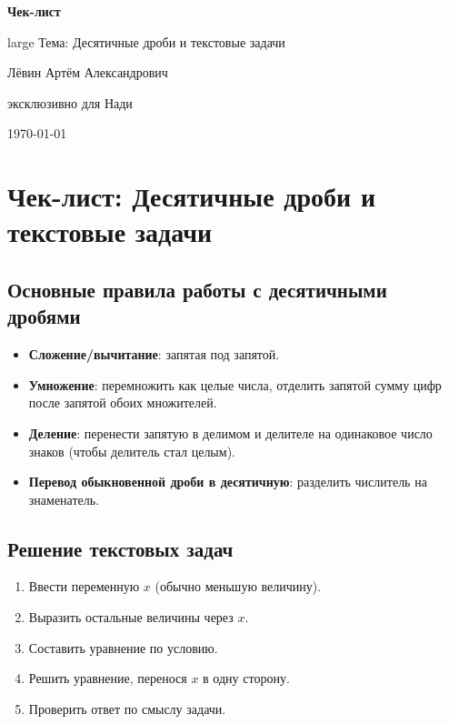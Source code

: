 \documentclass[a4paper,12pt]{article}
\begin{document}
\begin{titlepage}
\centering
\vspace*{2cm}
{\Large\bfseries\color{darkaccent} Чек-лист}\par
\vspace{0.5cm}
{{large Тема: Десятичные дроби и текстовые задачи}}\par
\vspace{2cm}
{\large Лёвин Артём Александрович}\par
{\large эксклюзивно для Нади}\par
\vspace{2cm}
{\today}\par
\vfill
{}
\vspace{1cm}
\end{titlepage}

\section*{Чек-лист: Десятичные дроби и текстовые задачи}

\subsection*{Основные правила работы с десятичными дробями}
\begin{itemize}[leftmargin=*]
\item \textbf{Сложение/вычитание}: запятая под запятой.
\item \textbf{Умножение}: перемножить как целые числа, отделить запятой сумму цифр после запятой обоих множителей.
\item \textbf{Деление}: перенести запятую в делимом и делителе на одинаковое число знаков (чтобы делитель стал целым).
\item \textbf{Перевод обыкновенной дроби в десятичную}: разделить числитель на знаменатель.
\end{itemize}

\subsection*{Решение текстовых задач}
\begin{enumerate}[leftmargin=*]
\item Ввести переменную $x$ (обычно меньшую величину).
\item Выразить остальные величины через $x$.
\item Составить уравнение по условию.
\item Решить уравнение, перенося $x$ в одну сторону.
\item Проверить ответ по смыслу задачи.
\end{enumerate}
\end{document}
